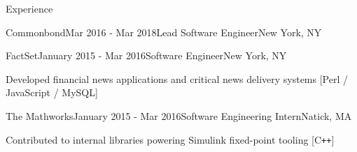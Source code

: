 \documentclass{resume} %
\begin{document}
\begin{rSection}{Experience}
\begin{rSubsection}{Commonbond}{Mar 2016 - Mar 2018}{Lead Software Engineer}{New York, NY}
\end{rSubsection}


\begin{rSubsection}{FactSet}{January 2015 - Mar 2016}{Software Engineer}{New York, NY}
\item Developed financial news applications and critical news delivery systems {\footnotesize [Perl / JavaScript / MySQL]}

\end{rSubsection}


\begin{rSubsection}{The Mathworks}{January 2015 - Mar 2016}{Software Engineering Intern}{Natick, MA}
\item Contributed to internal libraries powering Simulink fixed-point tooling {\footnotesize [C\texttt{++}]}

\end{rSubsection}
\end{rSection}





\end{document}
